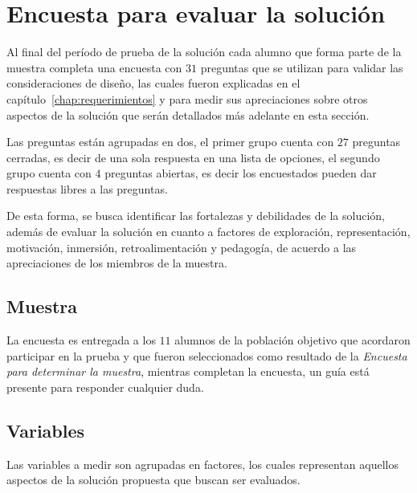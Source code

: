 \section{Encuesta para evaluar la solución}
\label{sec:subjetiva}

Al final del período de prueba de la solución cada alumno que forma parte de la muestra
completa una encuesta con $31$ preguntas que se utilizan para validar las
consideraciones de diseño, las cuales fueron explicadas en el capítulo~\ref{chap:requerimientos}
y para medir sus apreciaciones sobre otros aspectos de la solución que serán
detallados más adelante en esta sección. 

Las preguntas están agrupadas en dos, el primer grupo cuenta con $27$ preguntas
cerradas, es decir de una sola respuesta en una lista de opciones, el segundo
grupo cuenta con $4$ preguntas abiertas, es decir los encuestados pueden dar
respuestas libres a las preguntas. 

De esta forma, se busca identificar las fortalezas y debilidades de la solución,
además de evaluar la solución en cuanto a factores de exploración,
representación, motivación, inmersión, retroalimentación y pedagogía, de acuerdo
a las apreciaciones de los miembros de la muestra.

\subsection{Muestra}

La encuesta es entregada a los $11$ alumnos de la población objetivo que
acordaron participar en la prueba y que fueron seleccionados como resultado de
la \emph{Encuesta para determinar la muestra}, mientras completan la encuesta,
un guía está presente para responder cualquier duda.


\subsection{Variables}
\label{sec:variables}


Las variables a medir son agrupadas en
factores, los cuales representan aquellos aspectos de la solución propuesta que
buscan ser evaluados.

